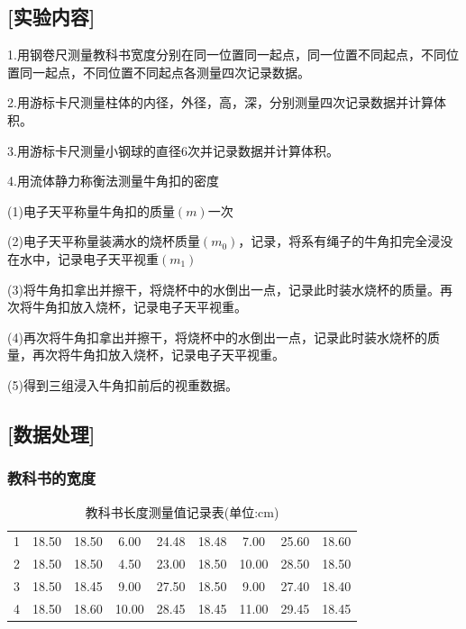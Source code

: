 \documentclass[12pt,a4paper,UTF8]{ctexart}
\begin{document}
\subsection*{[实验内容]}
\par 1.用钢卷尺测量教科书宽度分别在同一位置同一起点，同一位置不同起点，不同位置同一起点，不同位置不同起点各测量四次记录数据。
\par 2.用游标卡尺测量柱体的内径，外径，高，深，分别测量四次记录数据并计算体积。
\par 3.用游标卡尺测量小钢球的直径6次并记录数据并计算体积。
\par 4.用流体静力称衡法测量牛角扣的密度
\par (1)电子天平称量牛角扣的质量$(m)$一次
\par (2)电子天平称量装满水的烧杯质量$(m_0)$，记录，将系有绳子的牛角扣完全浸没在水中，记录电子天平视重$(m_1)$
\par (3)将牛角扣拿出并擦干，将烧杯中的水倒出一点，记录此时装水烧杯的质量。再次将牛角扣放入烧杯，记录电子天平视重。
\par (4)再次将牛角扣拿出并擦干，将烧杯中的水倒出一点，记录此时装水烧杯的质量，再次将牛角扣放入烧杯，记录电子天平视重。
\par (5)得到三组浸入牛角扣前后的视重数据。
\subsection*{[数据处理]}
\subsubsection*{教科书的宽度}

\begin{table}[!htbp]
	\centering
	\caption{教科书长度测量值记录表(单位:cm)}
	\begin{tabular}{ccccccccc}
		\toprule
		\makebox[0.08\textwidth][c]{次数}&\makebox[0.08\textwidth][c]{$l_1$}&\makebox[0.08\textwidth][c]{$l_2$}&\makebox[0.08\textwidth][c]{$l_3$起}&\makebox[0.08\textwidth][c]{$l_3$末}&\makebox[0.08\textwidth][c]{$l_3$}&\makebox[0.08\textwidth][c]{$l_4$起}&\makebox[0.08\textwidth][c]{$l_4$末}&\makebox[0.08\textwidth][c]{$l_4$}\\
		\midrule
		1 & 18.50 & 18.50  	& 6.00 	& 24.48 & 18.48 & 7.00 	& 25.60 & 18.60\\
		2 & 18.50 & 18.50 	& 4.50 	& 23.00 & 18.50 & 10.00 & 28.50 & 18.50\\
		3 & 18.50 & 18.45   & 9.00 	& 27.50 & 18.50 & 9.00 	& 27.40 & 18.40\\
		4 & 18.50 & 18.60   & 10.00 & 28.45 & 18.45 & 11.00 & 29.45 & 18.45\\	
		\bottomrule
	\end{tabular}
	\end{table}
\clearpage
\end{document}
